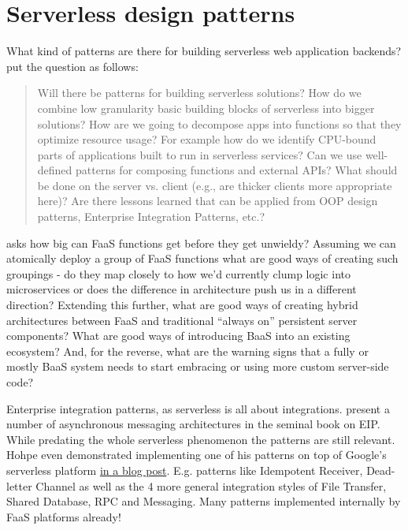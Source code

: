 \chapter{Serverless design patterns} \label{cha:patterns}

What kind of patterns are there for building serverless web application backends? \textcite{baldini17currentTrends} put the question as follows:

\begin{quote}
Will there be patterns for building serverless solutions? How do we combine low granularity basic building blocks of serverless into bigger solutions? How are we going to decompose apps into functions so that they optimize resource usage? For example how do we identify CPU-bound parts of applications built to run in serverless services? Can we use well-defined patterns for composing functions and external APIs? What should be done on the server vs. client (e.g., are thicker clients more appropriate here)? Are there lessons learned that can be applied from OOP design patterns, Enterprise Integration Patterns, etc.?
\end{quote}

\textcite{robert2016serverlessarchitectures} asks how big can FaaS functions get before they get unwieldy? Assuming we can atomically deploy a group of FaaS functions what are good ways of creating such groupings - do they map closely to how we’d currently clump logic into microservices or does the difference in architecture push us in a different direction? Extending this further, what are good ways of creating hybrid architectures between FaaS and traditional “always on” persistent server components? What are good ways of introducing BaaS into an existing ecosystem? And, for the reverse, what are the warning signs that a fully or mostly BaaS system needs to start embracing or using more custom server-side code?

Enterprise integration patterns, as serverless is all about integrations. \textcite{hohpe2004enterprise} present a number of asynchronous messaging architectures in the seminal book on EIP. While predating the whole serverless phenomenon the patterns are still relevant. Hohpe even demonstrated implementing one of his patterns on top of Google's serverless platform \href{http://www.enterpriseintegrationpatterns.com/ramblings/google_cloud_functions.html}{in a blog post}. E.g. patterns like Idempotent Receiver, Dead-letter Channel as well as the 4 more general integration styles of File Transfer, Shared Database, RPC and Messaging. Many patterns implemented internally by FaaS platforms already!

